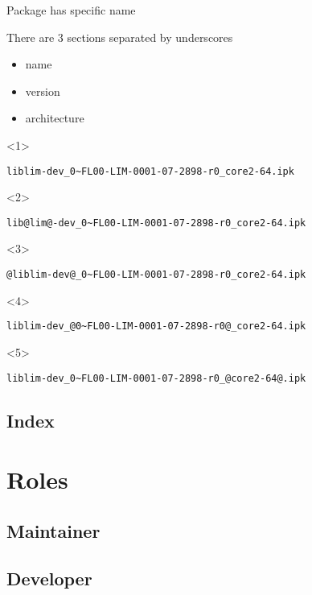 \documentclass{beamer}
\begin{document}
\begin{frame}[fragile]{Package has specific name}
    \begin{block}{}
        There are 3 sections separated by underscores
        \begin{itemize}
            \item<2->{name }
            \item<4->{version}
            \item<5->{architecture}
        \end{itemize}
    \end{block}
\begin{onlyenv}<1>\begin{lstlisting}[style=TinyConsole]
liblim-dev_0~FL00-LIM-0001-07-2898-r0_core2-64.ipk
\end{lstlisting}\end{onlyenv}
\begin{onlyenv}<2>\begin{lstlisting}[style=TinyConsole]
lib@lim@-dev_0~FL00-LIM-0001-07-2898-r0_core2-64.ipk
\end{lstlisting}\end{onlyenv}
\begin{onlyenv}<3>\begin{lstlisting}[style=TinyConsole]
@liblim-dev@_0~FL00-LIM-0001-07-2898-r0_core2-64.ipk
\end{lstlisting}\end{onlyenv}
\begin{onlyenv}<4>\begin{lstlisting}[style=TinyConsole]
liblim-dev_@0~FL00-LIM-0001-07-2898-r0@_core2-64.ipk
\end{lstlisting}\end{onlyenv}
\begin{onlyenv}<5>\begin{lstlisting}[style=TinyConsole]
liblim-dev_0~FL00-LIM-0001-07-2898-r0_@core2-64@.ipk
\end{lstlisting}\end{onlyenv}
\end{frame}

\subsection{Index}

\begin{frame}
\end{frame}

\section{Roles}

\subsection{Maintainer}

\begin{frame}
\end{frame}

\subsection{Developer}

\begin{frame}
\end{frame}
\end{document}
